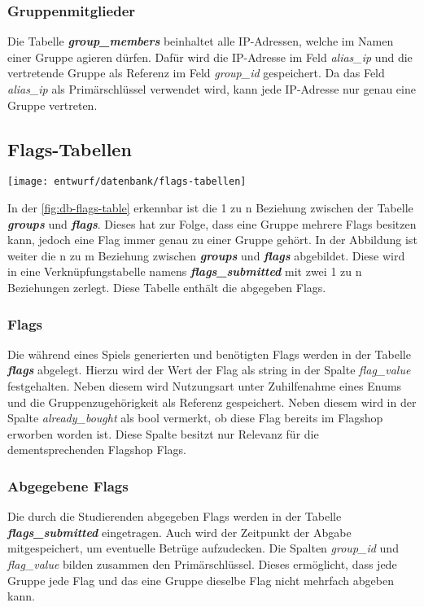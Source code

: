 \subsubsection{Gruppenmitglieder}
Die Tabelle \textbf{\textit{group\_members}} beinhaltet alle IP-Adressen, welche im Namen einer Gruppe agieren dürfen. Dafür wird die IP-Adresse im Feld \textit{alias\_ip} und die vertretende Gruppe als Referenz im Feld \textit{group\_id} gespeichert. Da das Feld \textit{alias\_ip} als Primärschlüssel verwendet wird, kann jede IP-Adresse nur genau eine Gruppe vertreten.

\subsection{Flags-Tabellen}
\begin{center}
	\texttt{[image: entwurf/datenbank/flags-tabellen]}
	\label{fig:db-flags-table}
\end{center}


In der \autoref{fig:db-flags-table} erkennbar ist die 1 zu n Beziehung zwischen der Tabelle \textbf{\textit{groups}} und \textbf{\textit{flags}}. Dieses hat zur Folge, dass eine Gruppe mehrere Flags besitzen kann, jedoch eine Flag immer genau zu einer Gruppe gehört. In der Abbildung ist weiter die n zu m Beziehung zwischen \textbf{\textit{groups}} und \textbf{\textit{flags}} abgebildet. Diese wird in eine Verknüpfungstabelle namens \textbf{\textit{flags\_submitted}} mit zwei 1 zu n Beziehungen zerlegt. Diese Tabelle enthält die abgegeben Flags.
 
\subsubsection{Flags}
Die während eines Spiels generierten und benötigten Flags werden in der Tabelle \textbf{\textit{flags}} abgelegt. Hierzu wird der Wert der Flag als string in der Spalte \textit{flag\_value} festgehalten. Neben diesem wird Nutzungsart unter Zuhilfenahme eines Enums und die Gruppenzugehörigkeit als Referenz gespeichert. Neben diesem wird in der Spalte \textit{already\_bought} als bool vermerkt, ob diese Flag bereits im Flagshop erworben worden ist. Diese Spalte besitzt nur Relevanz für die dementsprechenden Flagshop Flags.

\subsubsection{Abgegebene Flags}
Die durch die Studierenden abgegeben Flags werden in der Tabelle \textbf{\textit{flags\_submitted}} eingetragen. Auch wird der Zeitpunkt der Abgabe mitgespeichert, um eventuelle Betrüge aufzudecken. Die Spalten \textit{group\_id} und \textit{flag\_value} bilden zusammen den Primärschlüssel. Dieses ermöglicht, dass jede Gruppe jede Flag und das eine Gruppe dieselbe Flag nicht mehrfach abgeben kann.

